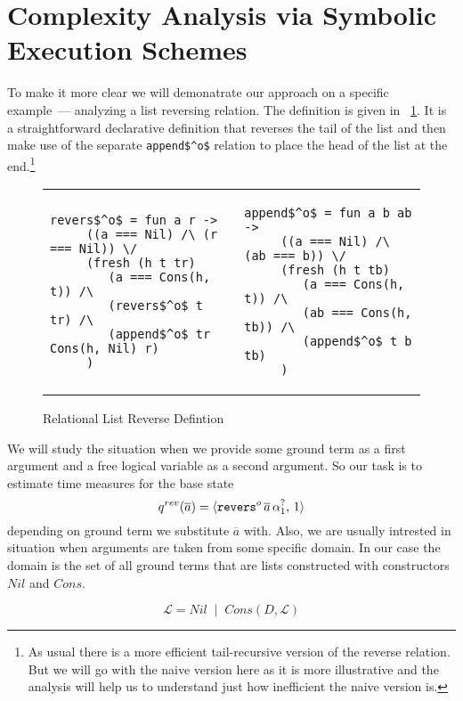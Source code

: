 \section{Complexity Analysis via Symbolic Execution Schemes}
\label{sec:symbolic}

To make it more clear we will demonatrate our approach on a specific example~--- analyzing a list reversing relation. The definition is given in \figureword~\ref{fig:reverso_definition}. It is a straightforward declarative definition that reverses the tail of the list and then make use of the separate \lstinline|append$^o$| relation to place the head of the list at the end.\footnote{As usual there is a more efficient tail-recursive version of the reverse relation. But we will go with the naive version here as it is more illustrative and the analysis will help us to understand just how inefficient the naive version is.}

\begin{figure}[t]
\begin{tabular}{p{6cm}p{6cm}}
\begin{lstlisting}[basicstyle=\small]
   revers$^o$ = fun a r ->
     ((a === Nil) /\ (r === Nil)) \/
     (fresh (h t tr)
        (a === Cons(h, t)) /\
        (revers$^o$ t tr) /\
        (append$^o$ tr Cons(h, Nil) r)
     )
\end{lstlisting} &
\begin{lstlisting}[basicstyle=\small]
   append$^o$ = fun a b ab ->
     ((a === Nil) /\ (ab === b)) \/
     (fresh (h t tb)
        (a === Cons(h, t)) /\
        (ab === Cons(h, tb)) /\
        (append$^o$ t b tb)
     )
\end{lstlisting}
\end{tabular}

\caption{Relational List Reverse Defintion}
\label{fig:reverso_definition}
\end{figure}

We will study the situation when we provide some ground term as a first argument and a free logical variable as a second argument. So our task is to estimate time measures for the base state \[ q^{rev}(\overline{a}) = \langle \texttt{revers$^o$} \, \overline{a} \, \alpha_1^?  ,\, 1 \rangle \] depending on ground term we substitute $\overline{a}$ with. Also, we are usually intrested in situation when arguments are taken from some specific domain. In our case the domain is the set of all ground terms that are lists constructed with constructors $Nil$ and $Cons$.

\[ \mathcal{L} = Nil \; \mid \; Cons(D, \mathcal{L}) \]

